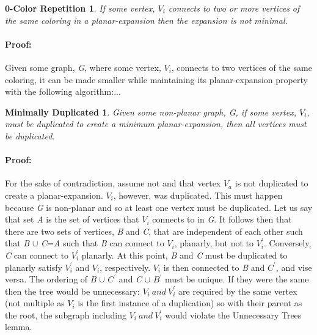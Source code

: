 \documentclass{article}
\newtheorem*{duplication}{Minimally Duplicated}
\newtheorem*{mincolor}{0-Color Repetition}
\begin{document}
\begin{mincolor}
If some vertex, $V_i$ connects to two or more vertices of the same coloring in a
planar-expansion then the expansion is not minimal.
\end{mincolor}
\paragraph{Proof: }
Given some graph, \emph{G}, where some vertex, $V_i$, connects 
to two vertices of the same coloring, it can be made smaller while maintaining 
its planar-expansion property with the following algorithm:...\\

\begin{duplication}
Given some non-planar graph, G, if some vertex, $V_i$, must be duplicated to 
create a minimum planar-expansion, then all vertices must be duplicated.
\end{duplication}
\paragraph{Proof: }
For the sake of contradiction, assume not and that 
vertex $V_a$ is not duplicated to create a planar-expansion. $V_i$, however, was
duplicated. This must happen because \emph{G} is non-planar and so at least one 
vertex must be duplicated. Let us say that set \emph{A} is the set of vertices 
that $V_i$ connects to in \emph{G}. It follows then that there are two sets of 
vertices, \emph{B} and \emph{C}, that are independent of each other such that 
\emph{B} $\cup$ \emph{C}=\emph{A} such that \emph{B} can connect to $V_i$,
 planarly, but not to $V^{'}_{i}$. Conversely, \emph{C} can connect to 
 $V^{'}_{i}$ planarly. At this point, \emph{B} and \emph{C} must be duplicated
 to planarly satisfy $V^{'}_i$ and $V_i$, respectively. $V_i$ is then 
 connected to \emph{B} and \emph{$C^{'}$}, and vise versa. The ordering of
 \emph{B} $\cup$ \emph{$C^{'}$} and \emph{C} $\cup$ \emph{$B^{'}$} must be 
 unique.  If they were the same then the tree would be unnecessary: $V_i\ and\ 
 V^{'}_{i}$ are required by the same vertex (not multiple as $V_i$ is the first
 instance of a duplication) so with their parent as the root, the subgraph
 including $V_i\ and\ V^{'}_{i}$ would violate the Unnecessary Trees lemma.
\end{document}
